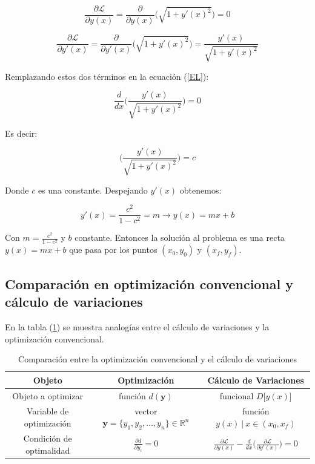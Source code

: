 \begin{equation}
    \frac{\partial \mathcal{L}}{\partial y(x)} = \frac{\partial}{\partial y(x)} \Big(\sqrt{1 + y'(x) ^2 } \Big) = 0 
\end{equation}

\begin{equation}
    \frac{\partial \mathcal{L}}{\partial y'(x)}=  \frac{\partial}{\partial y'(x)} \Big(\sqrt{1 + y'(x) ^2 } \Big) = \frac{y'(x)}{\sqrt{1+y'(x)^2}}
\end{equation}

Remplazando estos dos términos en la ecuación (\ref{EL}):

\begin{equation}
    \frac{d}{dx} \Bigg(\frac{y'(x)}{\sqrt{1+y'(x)^2}} \Bigg) = 0
\end{equation}

Es decir:

\begin{equation}
    \Bigg(\frac{y'(x)}{\sqrt{1+y'(x)^2}} \Bigg) = c
\end{equation}

Donde $c$ es una constante. Despejando $y'(x)$ obtenemos:

\begin{equation}
    y'(x) = \frac{c^2}{1-c^2} = m \rightarrow y(x) = mx + b
\end{equation}

Con $m =\frac{c^2}{1-c^2}$ y $b$  constante. Entonces la solución al problema es una recta $y(x) = mx + b$ que pasa por los puntos $(x_0,y_0)$ y $(x_f,y_f)$.

\subsection{Comparación en optimización convencional y cálculo de variaciones}

En la tabla (\ref{tb1}) se muestra analogías entre el cálculo de variaciones y la optimización convencional.

\begin{table}[ht!]
    \begin{tabular}{|c|c|c|}
        \hline
         \textbf{Objeto} & \textbf{Optimización} & \textbf{Cálculo de Variaciones}   \\
         \hline
        Objeto a optimizar & función $d(\bm{y})$ &  funcional $D[y(x)$]\\
        \hline
        Variable de optimización & vector $\bm{y} = \{ y_1,y_2,\dots,y_n\} \in \mathbb{R}^n$ & función $y(x) \ | \ x \in (x_0,x_f)$  \\
        \hline
        Condición de optimalidad & $\frac{\partial d}{\partial y_i} = 0$ & $    \frac{\partial \mathcal{L}}{\partial y(x)} - \frac{d}{dx} \big( \frac{\partial \mathcal{L}}{\partial y'(x)} \big) = 0
        $ \\ 
        \hline
    \end{tabular}
    \caption{Comparación entre la optimización convencional y el cálculo de variaciones} 
    \label{tb1}   
\end{table}


